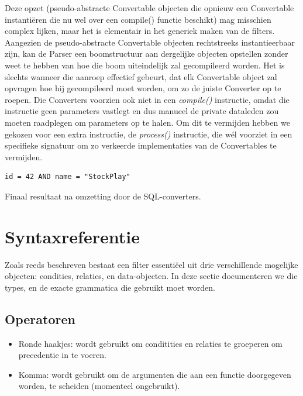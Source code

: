 Deze opzet (pseudo-abstracte Convertable objecten die opnieuw een Convertable instanti\"eren die nu wel over een compile() functie beschikt) mag misschien complex lijken, maar het is elementair in het generiek maken van de filters. Aangezien de pseudo-abstracte Convertable objecten rechtstreeks instantieerbaar zijn, kan de Parser een boomstructuur aan dergelijke objecten opstellen zonder weet te hebben van hoe die boom uiteindelijk zal gecompileerd worden. Het is slechts wanneer die aanroep effectief gebeurt, dat elk Convertable object zal opvragen hoe hij gecompileerd moet worden, om zo de juiste Converter op te roepen. Die Converters voorzien ook niet in een \emph{compile()} instructie, omdat die instructie geen parameters vastlegt en dus manueel de private dataleden zou moeten raadplegen om parameters op te halen. Om dit te vermijden hebben we gekozen voor een extra instructie, de \emph{process()} instructie, die w\'el voorziet in een specifieke signatuur om zo verkeerde implementaties van de Convertables te vermijden.

\begin{code}
\begin{verbatim}
id = 42 AND name = "StockPlay"
\end{verbatim}
\caption{Finaal resultaat na omzetting door de SQL-converters.}
\end{code}


\section{Syntaxreferentie}

Zoals reeds beschreven bestaat een filter essenti\"eel uit drie verschillende mogelijke objecten: condities, relaties, en data-objecten. In deze sectie documenteren we die types, en de exacte grammatica die gebruikt moet worden.

\subsection{Operatoren}

\begin{itemize}
\item{Ronde haakjes: wordt gebruikt om conditities en relaties te groeperen om precedentie in te voeren.}
\item{Komma: wordt gebruikt om de argumenten die aan een functie doorgegeven worden, te scheiden (momenteel ongebruikt).}
\end{itemize}

